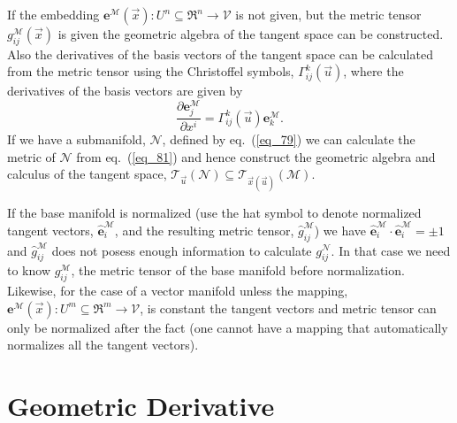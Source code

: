 \documentclass[12pt]{report}
\newcommand{\bm}[1]{\boldsymbol{#1}}
\newcommand{\bfrac}[2]{\displaystyle\frac{#1}{#2}}
\newcommand{\lp}{\left (}
\newcommand{\rp}{\right )}
\newcommand{\pdiff}[2]{\bfrac{\partial {#1}}{\partial {#2}}}
\newcommand{\f}[2]{{#1}\lp {#2} \rp}
\newcommand{\be}{\begin{equation}}
\newcommand{\ee}{\end{equation}}
\newcommand{\Tn}[2]{\f{\mathcal{T}_{#2}}{#1}}
\begin{document}
If the embedding $\f{\bm{e}^{\mathcal{M}}}{\vec{x}}\colon U^{n}\subseteq\Re^{n}\rightarrow \mathcal{V}$ is not given,
but the metric tensor $\f{g_{ij}^{\mathcal{M}}}{\vec{x}}$ is given the geometric algebra of the 
tangent space can be constructed.  Also the derivatives of the basis vectors of the tangent space can
be calculated from the metric tensor using the Christoffel symbols, $\f{\Gamma_{ij}^{k}}{\vec{u}}$, where the derivatives of the basis vectors are given by
\be
	\pdiff{\bm{e}_{j}^{\mathcal{M}}}{x^{i}} =\f{\Gamma_{ij}^{k}}{\vec{u}}\bm{e}_{k}^{\mathcal{M}}.
\ee 
If we have a submanifold, $\mathcal{N}$, defined by eq.~(\ref{eq_79}) we can calculate the metric of
$\mathcal{N}$ from eq.~(\ref{eq_81}) and hence construct the geometric algebra and calculus of the 
tangent space, $\Tn{\mathcal{N}}{\vec{u}}\subseteq \Tn{\mathcal{M}}{\f{\vec{x}}{\vec{u}}}$.

If the base manifold is normalized (use the hat symbol to denote normalized tangent vectors, 
 $\hat{\bm{e}}_{i}^{\mathcal{M}}$, and the resulting metric tensor, $\hat{g}_{ij}^{\mathcal{M}}$) we have
$\hat{\bm{e}}_{i}^{\mathcal{M}}\cdot\hat{\bm{e}}_{i}^{\mathcal{M}} = \pm 1$ and $\hat{g}_{ij}^{\mathcal{M}}$ does not posess enough
information to calculate $g_{ij}^{\mathcal{N}}$.  In that case we need to know $g_{ij}^{\mathcal{M}}$, the
metric tensor of the base manifold before normalization.  Likewise, for the case of a vector
manifold unless the mapping, $\f{\bm{e}^{\mathcal{M}}}{\vec{x}}\colon U^{m}\subseteq\Re^{m}\rightarrow \mathcal{V}$, is 
constant the tangent vectors and metric tensor can only be normalized after the fact (one cannot have a
mapping that automatically normalizes all the tangent vectors).

\section{Geometric Derivative}
\end{document}

